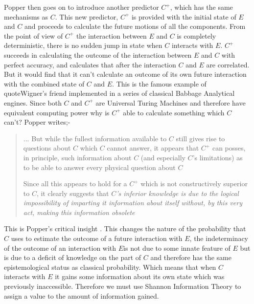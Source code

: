 Popper then goes on to introduce another predictor $C^+$, which has the same mechanisms as $C$. This new predictor, $C^+$ is provided with the initial state of $E$ and $C$ and proceeds to calculate the future motions of all the components. From the point of view of $C^+$ the interaction between $E$ and $C$ is completely deterministic, there is no sudden jump in state when $C$ interacts with $E$. $C^+$ succeeds in calculating the outcome of the interaction between $E$ and $C$ with perfect accuracy, and calculates that after the interaction $C$ and $E$ are correlated. But it would find that it can't calculate an outcome of its own future interaction with the combined state of $C$ and $E$. This is the famous example of \textquote{}quote{Wigner's friend} \autocite{wigner_1961} implemented in a series of classical Babbage Analytical engines. Since both $C$ and $C^+$ are Universal Turing Machines and therefore have equivalent computing power why is $C^+$ able to calculate something which $C$ can't?
Popper writes;-
\begin{quotation}
  ... But while the fullest information available to $C$ still gives rise to questions about $C$ which $C$ cannot answer, it appears that $C^+$ can posses, in principle, such information about $C$ (and especially $C$'s limitations) as to be able to answer every physical question about $C$
  \par
  Since all this appears to hold for a $C^+$ which is not constructively superior to $C$, it clearly suggests that \emph{$C$'s inferior knowledge is due to the logical impossibility of imparting it information about itself without, by this very act, making this information obsolete}
  \par
  \hfill \autocite[p.~188]{Popper1950a}
\end{quotation}
This is Popper's critical insight . This changes the nature of the probability that $C$ uses to estimate the outcome of a future interaction with $E$, the indeterminacy of the outcome of an interaction with $E$is not due to some innate feature of $E$ but is due to a deficit of knowledge on the part of $C$ and therefore has the same epistemological status as classical probability. Which means that when $C$ interacts with $E$ it gains some information about its own state which was previously inaccessible. Therefore we must use Shannon Information Theory to assign a value to the amount of information gained.

